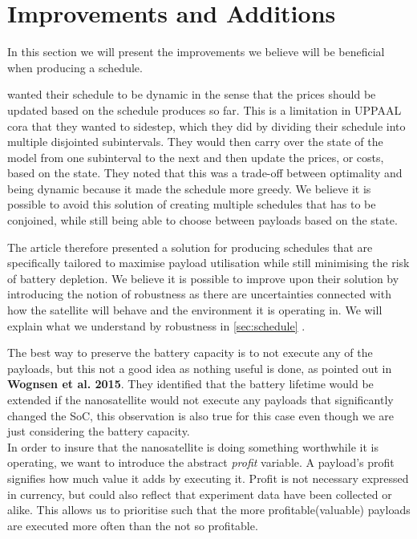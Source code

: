 \section{Improvements and Additions}
In this section we will present the improvements we believe will be beneficial when producing a schedule. %

\cite{gomx3} wanted their schedule to be dynamic in the sense that the prices should be updated based on the schedule produces so far. This is a limitation in UPPAAL \gls {cora} that they wanted to sidestep, which they did by dividing their schedule into multiple disjointed subintervals. They would then carry over the state of the model from one subinterval to the next and then update the prices, or costs, based on the state. They noted that this was a trade-off between optimality and being dynamic because it made the schedule more greedy. We believe it is possible to avoid this solution of creating multiple schedules that has to be conjoined, while still being able to choose between payloads based on the state. %

The article therefore presented a solution for producing schedules that are specifically tailored to maximise payload utilisation while still minimising the risk of battery depletion. We believe it is possible to improve upon their solution by introducing the notion of robustness as there are uncertainties connected with how the satellite will behave and the environment it is operating in. We will explain what we understand by robustness in \cref{sec:schedule} .

The best way to preserve the battery capacity is to not execute any of the payloads, but this not a good idea as nothing useful is done, as pointed out in \textbf{Wognsen et al. 2015}\cite{score_function}. They identified that the battery lifetime would be extended if the nanosatellite would not execute any payloads that significantly changed the SoC, this observation is also true for this case even though we are just considering the battery capacity.\\
In order to insure that the nanosatellite is doing something worthwhile it is operating, we want to introduce the abstract \textit{profit} variable. A payload's profit signifies how much value it adds by executing it. Profit is not necessary expressed in currency, but could also reflect that experiment data have been collected or alike. This allows us to prioritise such that the more profitable(valuable) payloads are executed more often than the not so profitable.

